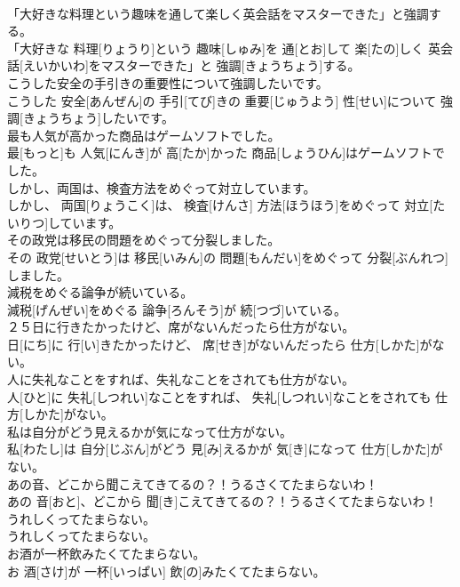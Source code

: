 \documentclass[8pt]{extreport}
\begin{document}
\begin{CJK}{UTF8}{min}
\\	「大好きな料理という趣味を通して楽しく英会話をマスターできた」と強調する。	
\\	「大好きな 料理[りょうり]という 趣味[しゅみ]を 通[とお]して 楽[たの]しく 英会話[えいかいわ]をマスターできた」と 強調[きょうちょう]する。	
\\	こうした安全の手引きの重要性について強調したいです。	
\\	こうした 安全[あんぜん]の 手引[てび]きの 重要[じゅうよう] 性[せい]について 強調[きょうちょう]したいです。	
\\	最も人気が高かった商品はゲームソフトでした。	
\\	最[もっと]も 人気[にんき]が 高[たか]かった 商品[しょうひん]はゲームソフトでした。	
\\	しかし、両国は、検査方法をめぐって対立しています。	
\\	しかし、 両国[りょうこく]は、 検査[けんさ] 方法[ほうほう]をめぐって 対立[たいりつ]しています。	
\\	その政党は移民の問題をめぐって分裂しました。	
\\	その 政党[せいとう]は 移民[いみん]の 問題[もんだい]をめぐって 分裂[ぶんれつ]しました。	
\\	減税をめぐる論争が続いている。	
\\	減税[げんぜい]をめぐる 論争[ろんそう]が 続[つづ]いている。	
\\	２５日に行きたかったけど、席がないんだったら仕方がない。	
\\	日[にち]に 行[い]きたかったけど、 席[せき]がないんだったら 仕方[しかた]がない。	
\\	人に失礼なことをすれば、失礼なことをされても仕方がない。	
\\	人[ひと]に 失礼[しつれい]なことをすれば、 失礼[しつれい]なことをされても 仕方[しかた]がない。	
\\	私は自分がどう見えるかが気になって仕方がない。	
\\	私[わたし]は 自分[じぶん]がどう 見[み]えるかが 気[き]になって 仕方[しかた]がない。	
\\	あの音、どこから聞こえてきてるの？！うるさくてたまらないわ！	
\\	あの 音[おと]、どこから 聞[き]こえてきてるの？！うるさくてたまらないわ！	
\\	うれしくってたまらない。	
\\	うれしくってたまらない。	
\\	お酒が一杯飲みたくてたまらない。	
\\	お 酒[さけ]が 一杯[いっぱい] 飲[の]みたくてたまらない。	

\end{CJK}
\end{document}
